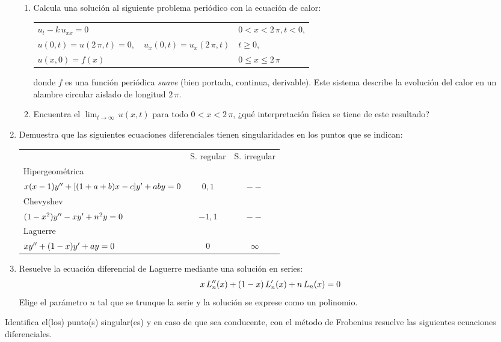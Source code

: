 \begin{enumerate}
\begin{enumerate}
\item Calcula una solución al siguiente problema periódico con la ecuación de calor:
\begin{table}[H]
\centering
\begin{tabular}{ l l}
$u_{t} - k \, u_{xx} = 0$ & $0 < x < 2 \, \pi,  t < 0$, \\
$u(0, t) = u(2 \, \pi, t) = 0, \quad u_{x} (0, t) = u_{x}(2 \, \pi, t)$ & $t \geq 0$, \\
$u(x, 0) = f(x)$ & $0 \leq x \leq 2 \, \pi$
\end{tabular}
\end{table}
donde $f$ es una función periódica \emph{suave} (bien portada, continua, derivable). Este sistema describe la evolución del calor en un alambre circular aislado de longitud $2 \, \pi$.
\item Encuentra el $\displaystyle{\lim_{t \to \infty}} \, u(x, t)$ para todo $0 < x < 2 \, \pi$, ¿qué interpretación física se tiene de este resultado?
\end{enumerate}
\item Demuestra que las siguientes ecuaciones diferenciales tienen singularidades en los puntos que se indican:
\begin{table}[H]
\centering
\begin{tabular}{l c c}
 & S. regular & S. irregular \\
Hipergeométrica & & \\
$x(x-1) {y}^{\prime \prime} + [(1 + a + b) x - c] {y}^{\prime} + a b y = 0$ & $0, 1$ & $--$ \\
Chevyshev & & \\
$(1 - x^{2}) {y}^{\prime \prime} - x {y}^{\prime} + n^{2} y = 0$ & $- 1, 1$ & $--$ \\
Laguerre & & \\
$x {y}^{\prime \prime} + (1 - x) {y}^{\prime} + a y = 0$ & $0$ & $\infty$
\end{tabular}
\end{table}
\item Resuelve la ecuación diferencial de Laguerre mediante una solución en series:
\begin{align*}
x \, {L}^{\prime \prime}_{n} (x) + (1 - x) \, {L}^{\prime}_{n} (x) + n \, L_{n} (x) = 0
\end{align*}
Elige el parámetro $n$ tal que se trunque la serie y la solución se exprese como un polinomio.
\end{enumerate}
Identifica el(los) punto(s) singular(es) y en caso de que sea conducente, con el método de Frobenius resuelve las siguientes ecuaciones diferenciales.
